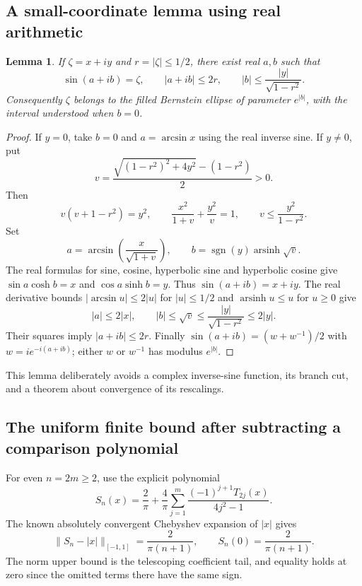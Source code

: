 \documentclass[11pt,a4paper]{article}
\newtheorem{lemma}[theorem]{Lemma}
\theoremstyle{definition}
\begin{document}
\subsection{A small-coordinate lemma using real arithmetic}
\begin{lemma}\label{lem:bern-sine-coordinates}
If $\zeta=x+iy$ and $r=|\zeta|\le1/2$, there exist real $a,b$ such that
\[
 \sin(a+ib)=\zeta,\qquad
 |a+ib|\le2r,\qquad
 |b|\le\frac{|y|}{\sqrt{1-r^2}}.
\]
Consequently $\zeta$ belongs to the filled Bernstein ellipse of parameter
$e^{|b|}$, with the interval understood when $b=0$.
\end{lemma}
\begin{proof}
If $y=0$, take $b=0$ and $a=\arcsin x$ using the real inverse sine.
If $y\ne0$, put
\[
 v=\frac{\sqrt{(1-r^2)^2+4y^2}-(1-r^2)}2>0.
\]
Then
\[
 v(v+1-r^2)=y^2,
 \qquad \frac{x^2}{1+v}+\frac{y^2}{v}=1,
 \qquad v\le\frac{y^2}{1-r^2}.
\]
Set
\[
 a=\arcsin\!\left(\frac{x}{\sqrt{1+v}}\right),
 \qquad b=\operatorname{sgn}(y)\operatorname{arsinh}\sqrt v.
\]
The real formulas for sine, cosine, hyperbolic sine and hyperbolic cosine
give $\sin a\cosh b=x$ and $\cos a\sinh b=y$. Thus
$\sin(a+ib)=x+iy$. The real derivative bounds
$|\arcsin u|\le2|u|$ for $|u|\le1/2$ and
$\operatorname{arsinh}u\le u$ for $u\ge0$ give
\[
 |a|\le2|x|,\qquad
 |b|\le\sqrt v\le\frac{|y|}{\sqrt{1-r^2}}
 \le2|y|.
\]
Their squares imply $|a+ib|\le2r$.
Finally $\sin(a+ib)=(w+w^{-1})/2$ with
$w=i e^{-i(a+ib)}$; either $w$ or $w^{-1}$ has modulus $e^{|b|}$.
\end{proof}

This lemma deliberately avoids a complex inverse-sine function, its
branch cut, and a theorem about convergence of its rescalings.

\subsection{The uniform finite bound after subtracting a comparison polynomial}
For even $n=2m\ge2$, use the explicit polynomial
\[
 S_n(x)=\frac2\pi+\frac4\pi\sum_{j=1}^{m}
      \frac{(-1)^{j+1}T_{2j}(x)}{4j^2-1}.
\]
The known absolutely convergent Chebyshev expansion of $|x|$ gives
\begin{equation}
 \|S_n-|x|\|_{[-1,1]}=\frac2{\pi(n+1)},
 \qquad S_n(0)=\frac2{\pi(n+1)}.
 \label{eq:bern-comparison}
\end{equation}
The norm upper bound is the telescoping coefficient tail, and equality
holds at zero since the omitted terms there have the same sign.
\end{document}
